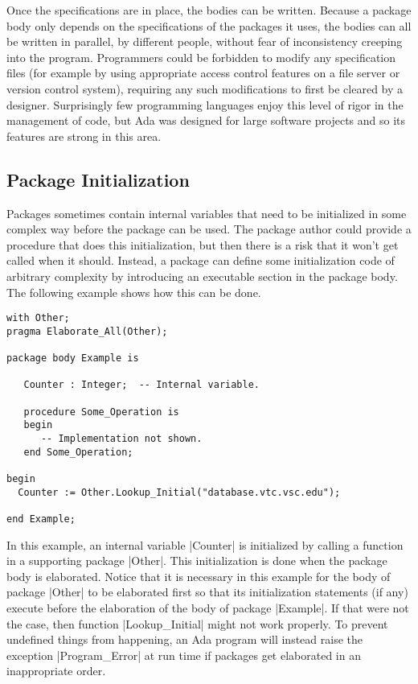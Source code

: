 Once the specifications are in place, the bodies can be written. Because a package body only
depends on the specifications of the packages it uses, the bodies can all be written in
parallel, by different people, without fear of inconsistency creeping into the program.
Programmers could be forbidden to modify any specification files (for example by using
appropriate access control features on a file server or version control system), requiring any
such modifications to first be cleared by a designer. Surprisingly few programming languages
enjoy this level of rigor in the management of code, but Ada was designed for large software
projects and so its features are strong in this area.

\subsection{Package Initialization}

Packages sometimes contain internal variables that need to be initialized in some complex way
before the package can be used. The package author could provide a procedure that does this
initialization, but then there is a risk that it won't get called when it should. Instead, a
package can define some initialization code of arbitrary complexity by introducing an executable
section in the package body. The following example shows how this can be done.

\begin{lstlisting}
with Other;
pragma Elaborate_All(Other);

package body Example is

   Counter : Integer;  -- Internal variable.

   procedure Some_Operation is
   begin
      -- Implementation not shown.
   end Some_Operation;

begin
  Counter := Other.Lookup_Initial("database.vtc.vsc.edu");

end Example;
\end{lstlisting}

In this example, an internal variable |Counter| is initialized by calling a function in a
supporting package |Other|. This initialization is done when the package body is elaborated.
Notice that it is necessary in this example for the body of package |Other| to be elaborated
first so that its initialization statements (if any) execute before the elaboration of the body
of package |Example|. If that were not the case, then function |Lookup_Initial| might not work
properly. To prevent undefined things from happening, an Ada program will instead raise the
exception |Program_Error| at run time if packages get elaborated in an inappropriate order.

